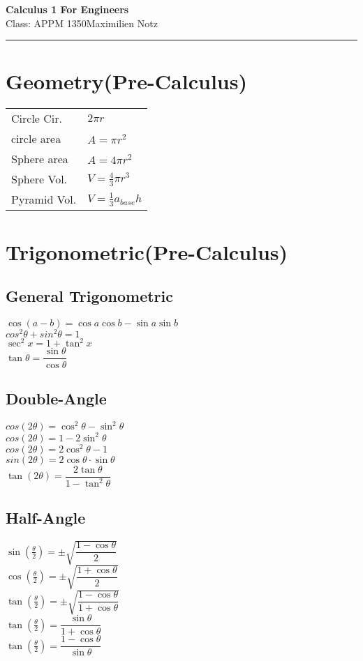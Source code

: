 \documentclass[5pt]{article}
\begin{document}
\begin{center}
     \Large{\textbf{Calculus 1 For Engineers}}\\
     \small{Class: APPM 1350}\hfill\small{\textcopyright Maximilien Notz \the\year{}}
     \noindent\rule{20.2cm}{0.4pt}
\end{center}


\begin{multicols}{3}
\setcounter{secnumdepth}{0}

\section{Geometry\footnotesize{(Pre-Calculus)}}
\begin{tabular}{ll}
Circle Cir. & $2\pi r$\\
circle area & $A=\pi r^2$\\
Sphere area & $A=4\pi r^2$\\
Sphere Vol. & $V =\frac{4}{3}\pi r^3$\\[1pt]
Pyramid Vol. & $V =\frac{1}{3}a_{base} h$\\

\end{tabular}

\section{Trigonometric\footnotesize{(Pre-Calculus)}}
\subsection{General Trigonometric}
$\cos(a-b)=\cos{a}\cos{b}-\sin{a}\sin{b}$\\
$cos^2\theta + sin^2\theta=1$\\
$\sec^2{x}=1+\tan^2{x}$\\
$\tan{\theta}=\dfrac{\sin{\theta}}{\cos{\theta}}$

\subsection{Double-Angle}
$cos(2\theta)=\cos^2{\theta}-\sin^2{\theta}$\\
$cos(2\theta)=1-2\sin^2{\theta}$\\
$cos(2\theta)=2\cos^2{\theta}-1$\\
$sin(2\theta)=2\cos{\theta}\cdot\sin{\theta}$\\
$\tan(2\theta)=\dfrac{2\tan{\theta}}{1-\tan^2{\theta}}$

\subsection{Half-Angle}
$\sin(\frac{\theta}{2})=\pm\sqrt{\dfrac{1-\cos{\theta}}{2}}$\\
$\cos(\frac{\theta}{2})=\pm\sqrt{\dfrac{1+\cos{\theta}}{2}}$\\
$\tan(\frac{\theta}{2})=\pm\sqrt{\dfrac{1-\cos{\theta}}{1+\cos{\theta}}}$\\[3pt]
$\tan(\frac{\theta}{2})= \dfrac{\sin{\theta}}{1+\cos{\theta}}$\\
$\tan(\frac{\theta}{2})= \dfrac{1-\cos{\theta}}{\sin{\theta}}$


\end{multicols}
\end{document}
